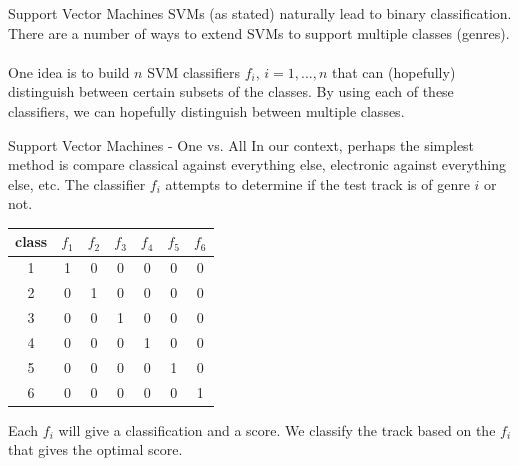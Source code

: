\documentclass[xcolor=dvipsnames,t]{beamer} %
\begin{document}
\begin{frame}{Support Vector Machines}
   SVMs (as stated) naturally lead to binary classification.  There are a number of ways to extend SVMs to support multiple classes (genres).\\

   ~\\
   One idea is to build $n$ SVM classifiers $f_i$, $i=1,...,n$ that can (hopefully) distinguish between certain subsets of the classes.  By using each of these classifiers, we can hopefully distinguish between multiple classes.\\
   
\end{frame}

\begin{frame}{Support Vector Machines - One vs. All}
   In our context, perhaps the simplest method is compare classical against everything else, electronic against everything else, etc.  The classifier $f_i$ attempts to determine if the test track is of genre $i$ or not.

\begin{table}
   \centering
   \begin{tabular}{|c|cccccc|}
      \hline
      class&$f_1$ & $f_2$ & $f_3$ & $f_4$ & $f_5$ & $f_6$\\\hline
      1 & 1 & 0 & 0 & 0 &0 &0\\\hline
      2 & 0 & 1 & 0 & 0 & 0 & 0\\\hline
      3 & 0 & 0 & 1 & 0 & 0 & 0\\\hline
      4 & 0 & 0 & 0 & 1 & 0 & 0\\\hline
      5 & 0 & 0 & 0 & 0 & 1 & 0\\\hline
      6 & 0 & 0 & 0 & 0 & 0 & 1\\\hline
   \end{tabular}
\end{table}

   Each $f_i$ will give a classification and a score.  We classify the track based on the $f_i$ that gives the optimal score.

\end{frame}
\end{document}
